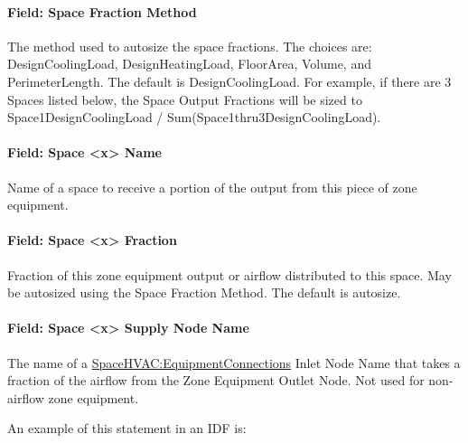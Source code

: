\paragraph{Field: Space Fraction Method}\label{field-seqsplitter-space-sizing-basis}

The method used to autosize the space fractions. The choices are: DesignCoolingLoad, DesignHeatingLoad, FloorArea, Volume, and PerimeterLength. The default is DesignCoolingLoad.
For example, if there are 3 Spaces listed below, the Space Output Fractions will be sized to Space1DesignCoolingLoad / Sum(Space1thru3DesignCoolingLoad).

\paragraph{Field: Space \textless{}x\textgreater{} Name}\label{field-seqsplitter-space-name}

Name of a space to receive a portion of the output from this piece of zone equipment.

\paragraph{Field: Space \textless{}x\textgreater{} Fraction}\label{field-seqsplitter-space-output-fraction}

Fraction of this zone equipment output or airflow distributed to this space. May be autosized using the Space Fraction Method. The default is autosize.

\paragraph{Field: Space \textless{}x\textgreater{} Supply Node Name}\label{field-seqsplitter-space-supply-node-name}

The name of a \hyperref[spacehvacequipmentconnections]{SpaceHVAC:EquipmentConnections} Inlet Node Name that takes a fraction of the airflow from the Zone Equipment Outlet Node.
Not used for non-airflow zone equipment.

An example of this statement in an IDF is:

